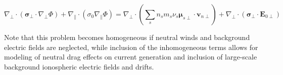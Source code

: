\documentclass[11pt,letterpaper]{article}
\begin{document}
\begin{linenomath*} \begin{equation}
\nabla_\perp \cdot \left( \boldsymbol{\sigma}_\perp \cdot \nabla_\perp \Phi \right) + \nabla_\parallel \cdot \left( \sigma_0 \nabla_\parallel \Phi \right)  = \nabla_\perp \cdot \left( \sum_s n_s m_s \nu_s \boldsymbol{\mu}_{s\perp} \cdot \mathbf{v}_{n\perp} \right) + \nabla_\perp \cdot \left( \boldsymbol{\sigma}_\perp \cdot \mathbf{E}_{0\perp} \right) \label{divJSS2}
\end{equation} \end{linenomath*}
Note that this problem becomes homogeneous if neutral winds and background electric fields are neglected, while inclusion of the inhomogeneous terms allows for modeling of neutral drag effects on current generation and inclusion of large-scale background ionospheric electric fields and drifts.






\end{document}
